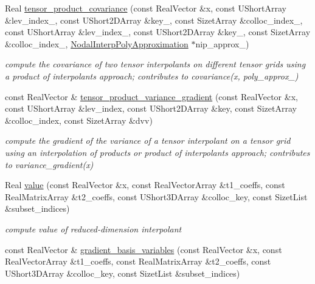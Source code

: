 \begin{DoxyCompactItemize}
Real \hyperlink{classPecos_1_1NodalInterpPolyApproximation_a4f0ee291e5061aedbbd6930aa607ead7}{tensor\+\_\+product\+\_\+covariance} (const Real\+Vector \&x, const U\+Short\+Array \&lev\+\_\+index\+\_, const U\+Short2\+D\+Array \&key\+\_, const Sizet\+Array \&colloc\+\_\+index\+\_, const U\+Short\+Array \&lev\+\_\+index\+\_, const U\+Short2\+D\+Array \&key\+\_, const Sizet\+Array \&colloc\+\_\+index\+\_, \hyperlink{classPecos_1_1NodalInterpPolyApproximation}{Nodal\+Interp\+Poly\+Approximation} $\ast$nip\+\_\+approx\+\_)
\begin{DoxyCompactList}\small\item\em compute the covariance of two tensor interpolants on different tensor grids using a product of interpolants approach; contributes to covariance(x, poly\+\_\+approx\+\_) \end{DoxyCompactList}\item 
const Real\+Vector \& \hyperlink{classPecos_1_1NodalInterpPolyApproximation_a2e321deaf54c63212ba2d926aa0ad08d}{tensor\+\_\+product\+\_\+variance\+\_\+gradient} (const Real\+Vector \&x, const U\+Short\+Array \&lev\+\_\+index, const U\+Short2\+D\+Array \&key, const Sizet\+Array \&colloc\+\_\+index, const Sizet\+Array \&dvv)
\begin{DoxyCompactList}\small\item\em compute the gradient of the variance of a tensor interpolant on a tensor grid using an interpolation of products or product of interpolants approach; contributes to variance\+\_\+gradient(x) \end{DoxyCompactList}\item 
Real \hyperlink{classPecos_1_1NodalInterpPolyApproximation_add4c66b2a8fb14693ad22751f7526b84}{value} (const Real\+Vector \&x, const Real\+Vector\+Array \&t1\+\_\+coeffs, const Real\+Matrix\+Array \&t2\+\_\+coeffs, const U\+Short3\+D\+Array \&colloc\+\_\+key, const Sizet\+List \&subset\+\_\+indices)
\begin{DoxyCompactList}\small\item\em compute value of reduced-\/dimension interpolant \end{DoxyCompactList}\item 
const Real\+Vector \& \hyperlink{classPecos_1_1NodalInterpPolyApproximation_ab95fcef1d7128a740285b8a8ce9071e4}{gradient\+\_\+basis\+\_\+variables} (const Real\+Vector \&x, const Real\+Vector\+Array \&t1\+\_\+coeffs, const Real\+Matrix\+Array \&t2\+\_\+coeffs, const U\+Short3\+D\+Array \&colloc\+\_\+key, const Sizet\+List \&subset\+\_\+indices)\label{classPecos_1_1NodalInterpPolyApproximation_ab95fcef1d7128a740285b8a8ce9071e4}


\end{DoxyCompactItemize}
